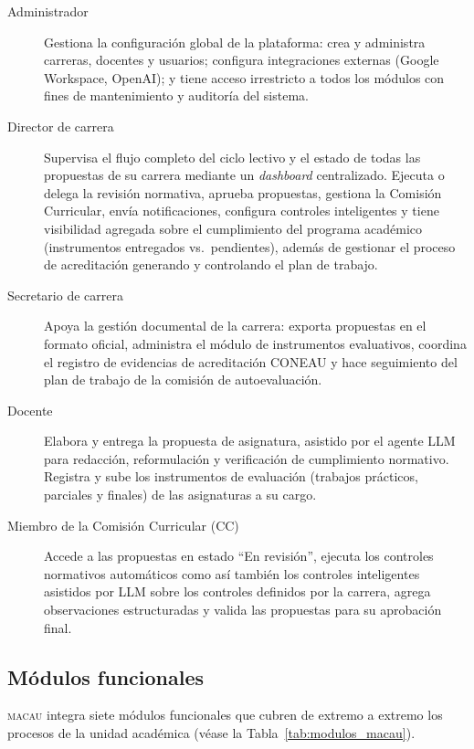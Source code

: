 \begin{description}
  \item[Administrador] Gestiona la configuración global de la plataforma: crea y
    administra carreras, docentes y usuarios; configura integraciones externas
    (Google Workspace, OpenAI); y tiene acceso irrestricto a todos los módulos
    con fines de mantenimiento y auditoría del sistema.

  \item[Director de carrera] Supervisa el flujo completo del ciclo lectivo y el estado de
    todas las propuestas de su carrera mediante un \textit{dashboard} centralizado.
    Ejecuta o delega la revisión normativa, aprueba propuestas, gestiona la Comisión
    Curricular, envía notificaciones, configura controles inteligentes y tiene visibilidad agregada sobre
    el cumplimiento del programa académico (instrumentos entregados vs.\ pendientes), además de gestionar el proceso de acreditación generando y controlando el plan de trabajo.

  \item[Secretario de carrera] Apoya la gestión documental de la carrera: exporta
    propuestas en el formato oficial, administra el módulo de instrumentos evaluativos,
    coordina el registro de evidencias de acreditación CONEAU y hace seguimiento
    del plan de trabajo de la comisión de autoevaluación.

  \item[Docente] Elabora y entrega la propuesta de asignatura, asistido por el agente LLM
    para redacción, reformulación y verificación de cumplimiento normativo.
    Registra y sube los instrumentos de evaluación (trabajos prácticos, parciales y finales)
    de las asignaturas a su cargo.

  \item[Miembro de la Comisión Curricular (CC)] Accede a las propuestas en estado
    ``En revisión'', ejecuta los controles normativos automáticos como así también los controles inteligentes asistidos por LLM sobre los controles definidos por la carrera, agrega observaciones
    estructuradas y valida las propuestas para su aprobación final.
\end{description}

\subsection{Módulos funcionales}

\textsc{macau} integra siete módulos funcionales que cubren de extremo a extremo
los procesos de la unidad académica (véase la Tabla~\ref{tab:modulos_macau}).


